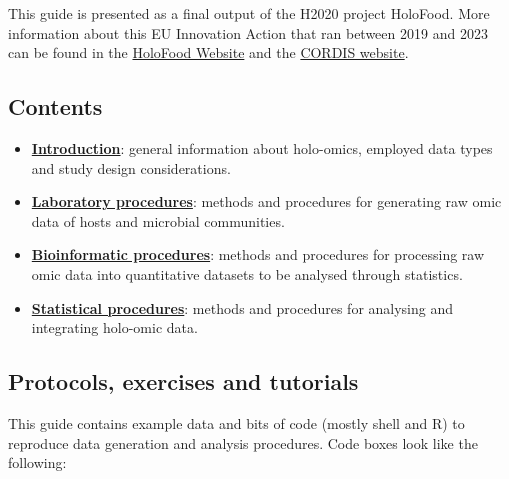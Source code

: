 \documentclass[
]{book}
\providecommand{\tightlist}{%
  \setlength{\itemsep}{0pt}\setlength{\parskip}{0pt}}
\begin{document}
This guide is presented as a final output of the H2020 project HoloFood. More information about this EU Innovation Action that ran between 2019 and 2023 can be found in the \href{http://www.holofood.eu}{HoloFood Website} and the \href{https://cordis.europa.eu/project/id/817729}{CORDIS website}.

\hypertarget{contents}{%
\subsection*{Contents}\label{contents}}

\begin{itemize}
\tightlist
\item
  \textbf{\protect\hyperlink{holo-omics}{Introduction}}: general information about holo-omics, employed data types and study design considerations.
\item
  \textbf{\protect\hyperlink{about-labwork}{Laboratory procedures}}: methods and procedures for generating raw omic data of hosts and microbial communities.
\item
  \textbf{\protect\hyperlink{about-bioinformatics}{Bioinformatic procedures}}: methods and procedures for processing raw omic data into quantitative datasets to be analysed through statistics.
\item
  \textbf{\protect\hyperlink{about-statistics}{Statistical procedures}}: methods and procedures for analysing and integrating holo-omic data.
\end{itemize}

\hypertarget{protocols-exercises-tutorials}{%
\subsection*{Protocols, exercises and tutorials}\label{protocols-exercises-tutorials}}

This guide contains example data and bits of code (mostly shell and R) to reproduce data generation and analysis procedures. Code boxes look like the following:
\end{document}
